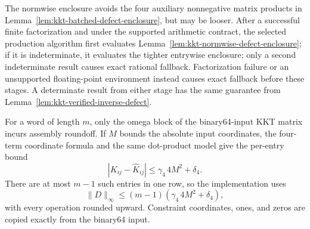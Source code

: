 \begin{remark}%
\label{rem:kkt-staged-defect-enclosure}
The normwise enclosure avoids the four auxiliary nonnegative matrix products
in Lemma~\ref{lem:kkt-batched-defect-enclosure}, but may be looser.  After a
successful finite factorization and under the supported arithmetic contract,
the selected production algorithm first evaluates
Lemma~\ref{lem:kkt-normwise-defect-enclosure}; if it is indeterminate, it
evaluates the tighter entrywise enclosure; only a second indeterminate result
causes exact rational fallback.  Factorization failure or an unsupported
floating-point environment instead causes exact fallback before these stages.
A determinate result from either stage has the same guarantee from
Lemma~\ref{lem:kkt-verified-inverse-defect}.

For a word of length \(m\), only the omega block of the binary64-input KKT
matrix incurs assembly roundoff.  If \(M\) bounds the absolute input
coordinates, the four-term coordinate formula and the same dot-product model
give the per-entry bound
\[
 |K_{ij}-\widehat K_{ij}|
 \leq \gamma_4\,4M^2+\delta_4.
\]
There are at most \(m-1\) such entries in one row, so the implementation uses
\[
 \|D\|_\infty
 \leq (m-1)(\gamma_4\,4M^2+\delta_4),
\]
with every operation rounded upward.  Constraint coordinates, ones, and zeros
are copied exactly from the binary64 input.
\end{remark}

